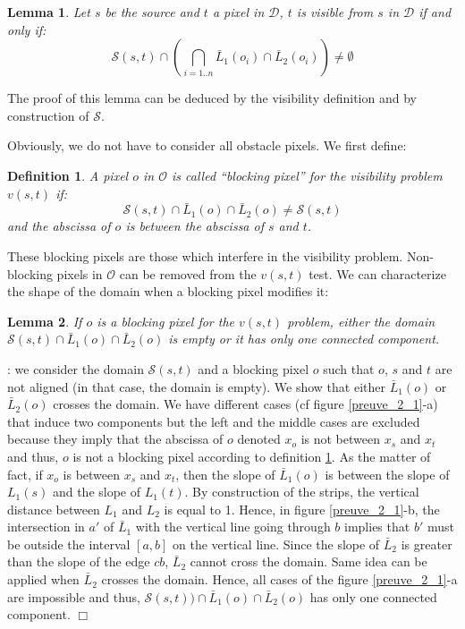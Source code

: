 \documentclass[fleqn,twoside]{article}
\newtheorem{defi}{Definition}
\newtheorem{lem}{Lemma}
\begin{document}
\begin{lem}
Let $s$ be the source and $t$ a pixel in $\mathcal{D}$, $t$ is visible
from $s$ in $\mathcal{D}$ if and only if:
\begin{equation}
  \mathcal{S}(s,t)\cap \left (  \bigcap_{i=1..n}\bar{L}_1(o_i)\cap \bar{L}_2(o_i)\right ) \neq \emptyset
\end{equation}
\end{lem}

The  proof of this lemma can  be  deduced by the visibility definition
and by construction of $\mathcal{S}$.

Obviously, we do not have to consider all obstacle pixels. We first define:
\begin{defi}
  A pixel $o$ in $\mathcal{O}$   is called ``blocking pixel'' for  the
  visibility problem $v(s,t)$ if:
  \begin{equation}
    \mathcal{S}(s,t) \cap \bar{L}_1(o)\cap \bar{L}_2(o)  \neq  \mathcal{S}(s,t)
  \end{equation}
and the abscissa of $o$ is between the abscissa of $s$ and $t$.
\label{def_b}
\end{defi}

These  blocking pixels are  those  which interfere  in  the visibility
problem. Non-blocking pixels in $\mathcal{O}$  can be removed from the
$v(s,t)$ test.   We can characterize  the shape of   the domain when a
blocking pixel modifies it:
\begin{lem}
  If $o$ is a blocking pixel for the $v(s,t)$ problem, either the  domain
  $\mathcal{S}(s,t)\cap\bar{L}_1(o)\cap \bar{L}_2(o)$  is empty or it
 has only one connected component.
\end{lem}

: we consider the domain $\mathcal{S}(s,t)$ and a blocking pixel $o$ such that 
$o$, $s$ and $t$ are not aligned (in  that case, the domain is empty).
We  show that  either $\bar{L}_1(o)$   or  $\bar{L}_2(o)$ crosses  the
domain.  We  have different cases  (cf figure \ref{preuve_2_1}-a) that
induce two  components but the left  and the middle cases are excluded
because they  imply  that the  abscissa of $o$   denoted $x_o$ is  not
between  $x_s$  and $x_t$  and thus,   $o$  is  not  a  blocking pixel
according to definition \ref{def_b}.  As  the matter of fact, if $x_o$
is  between  $x_s$  and  $x_t$, then the   slope of  $\bar{L}_1(o)$ is
between the   slope  of $L_1(s)$  and   the  slope of  $L_1(t)$.    By
construction of  the strips, the vertical  distance between  $L_1$ and
$L_2$  is  equal   to 1.  Hence,   in   figure \ref{preuve_2_1}-b, the
intersection  in  $a'$ of $\bar{L}_1$   with  the vertical  line going
through $b$ implies that $b'$ must be outside  the interval $[a,b]$ on
the vertical line. Since the slope of  $\bar{L}_2$ is greater than the
slope of the edge $cb$, $\bar{L}_2$ cannot cross the domain. Same idea
can be applied when $\bar{L}_2$ crosses  the domain.  Hence, all cases
of    the  figure    \ref{preuve_2_1}-a   are   impossible  and  thus,
$\mathcal{S}(s,t))\cap\bar{L}_1(o)\cap   \bar{L}_2(o)$ has only    one
connected component. \hfill $\Box$
\end{document}
